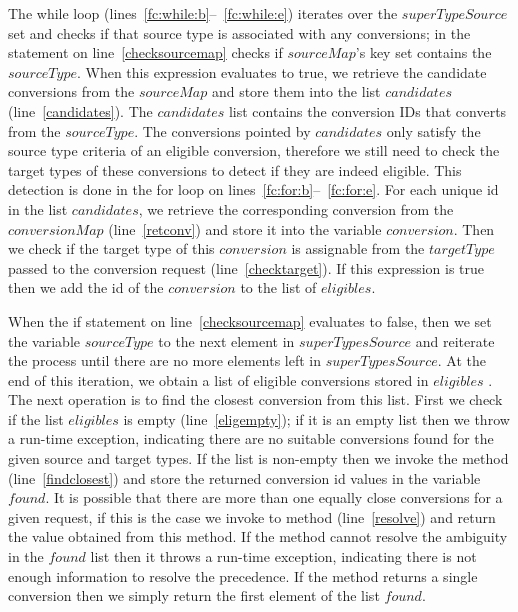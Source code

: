 The while loop (lines~\ref{fc:while:b}--~\ref{fc:while:e}) iterates over the $superTypeSource$ set and checks if that source type is associated with any conversions; in the  statement on line~\ref{checksourcemap} checks if $sourceMap$'s key set contains the $sourceType$.
When this expression evaluates to true, we retrieve the candidate conversions from the $sourceMap$ and store them into the list $candidates$ (line~\ref{candidates}).
The $candidates$ list contains the conversion IDs that converts from the $sourceType$.
The conversions pointed by $candidates$ only satisfy the source type criteria of an eligible conversion, therefore we still need to check the target types of these conversions to detect if they are indeed eligible.
This detection is done in the for loop on lines~\ref{fc:for:b}--~\ref{fc:for:e}.
For each unique id in the list $candidates$, we retrieve the corresponding conversion from the $conversionMap$ (line~\ref{retconv}) and store it into the variable $conversion$. 
Then we check if the target type of this $conversion$ is assignable from the $targetType$ passed to the conversion request (line~\ref{checktarget}). 
If this expression is true then we add the id of the $conversion$ to the list of $eligibles$.

When the if statement on line~\ref{checksourcemap} evaluates to false, then we set the variable $sourceType$ to the next element in $superTypesSource$ and reiterate the process until there are no more elements left in $superTypesSource$.
At the end of this iteration, we obtain a list of eligible conversions stored in $eligibles$
.
The next operation is to find the closest conversion from this list. 
First we check if the list $eligibles$ is empty (line~\ref{eligempty}); if it is an empty list then we throw a run-time exception, indicating there are no suitable conversions found for the given source and target types.
If the list is non-empty then we invoke the method  (line~\ref{findclosest}) and store the returned conversion id values in the variable $found$. 
It is possible that there are more than one equally close conversions for a given request, if this is the case we invoke to  method (line~\ref{resolve}) and return the value obtained from this method. 
If the  method cannot resolve the ambiguity in the $found$ list then it throws a run-time exception, indicating there is not enough information to resolve the precedence.
If the  method returns a single conversion then we simply return the first element of the list $found$.

